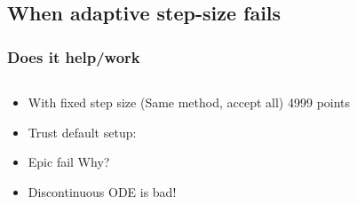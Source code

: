 \documentclass{beamer}
\begin{document}
\subsection{When adaptive step-size fails}
\begin{frame}
\frametitle{Does it help/work}
\begin{columns}
\begin{column}{0.5\linewidth}
\begin{itemize}
\item<1-> With fixed step size (Same method, accept all) 4999 points

\item<2-> Trust default setup:

\item<2-> Epic fail Why?

\item<2-> Discontinuous ODE is bad!

\end{itemize}
\end{column}
\begin{column}{0.5\linewidth}
\end{column}
\end{columns}
\end{frame}
\end{document}
